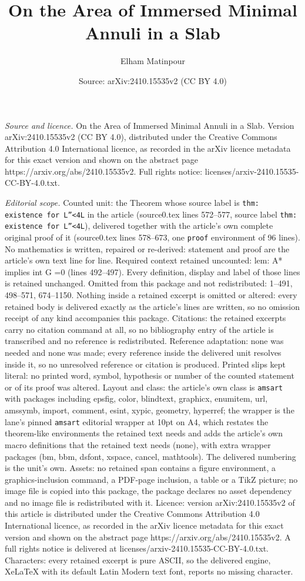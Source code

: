 \documentclass[10pt,a4paper]{amsart}
\title[On the Area of Immersed Minimal Annuli in a Slab]{On the Area of Immersed Minimal Annuli in a Slab}
\author{Elham Matinpour}
\date{Source: arXiv:2410.15535v2 (CC BY 4.0)}
\begin{document}
\maketitle

\noindent\emph{Source and licence.} On the Area of Immersed Minimal Annuli in a Slab. Version arXiv:2410.15535v2 (CC BY 4.0), distributed under the Creative Commons Attribution 4.0 International licence, as recorded in the arXiv licence metadata for this exact version and shown on the abstract page https://arxiv.org/abs/2410.15535v2. Full rights notice: licenses/arxiv-2410.15535-CC-BY-4.0.txt.\par\smallskip

\noindent\textit{Editorial scope.} Counted unit: the Theorem whose source label is \texttt{thm: existence for L''<4L} in the article (source0.tex lines 572--577, source label \texttt{thm: existence for L''<4L}), delivered together with the article's own complete original proof of it (source0.tex lines 578--673, one \texttt{proof} environment of 96 lines). No mathematics is written, repaired or re-derived: statement and proof are the article's own text line for line. Required context retained uncounted: lem: A* implies int G =0 (lines 492--497). Every definition, display and label of those lines is retained unchanged. Omitted from this package and not redistributed: 1--491, 498--571, 674--1150. Nothing inside a retained excerpt is omitted or altered: every retained body is delivered exactly as the article's lines are written, so no omission receipt of any kind accompanies this package. Citations: the retained excerpts carry no citation command at all, so no bibliography entry of the article is transcribed and no reference is redistributed. Reference adaptation: none was needed and none was made; every reference inside the delivered unit resolves inside it, so no unresolved reference or citation is produced. Printed slips kept literal: no printed word, symbol, hypothesis or number of the counted statement or of its proof was altered. Layout and class: the article's own class is \texttt{amsart} with packages including epsfig, color, blindtext, graphicx, enumitem, url, amssymb, import, comment, esint, xypic, geometry, hyperref; the wrapper is the lane's pinned \texttt{amsart} editorial wrapper at 10pt on A4, which restates the theorem-like environments the retained text needs and adds the article's own macro definitions that the retained text needs (none), with extra wrapper packages (bm, bbm, dsfont, xspace, cancel, mathtools). The delivered numbering is the unit's own. Assets: no retained span contains a figure environment, a graphics-inclusion command, a PDF-page inclusion, a table or a TikZ picture; no image file is copied into this package, the package declares no asset dependency and no image file is redistributed with it. Licence: version arXiv:2410.15535v2 of this article is distributed under the Creative Commons Attribution 4.0 International licence, as recorded in the arXiv licence metadata for this exact version and shown on the abstract page https://arxiv.org/abs/2410.15535v2. A full rights notice is delivered at licenses/arxiv-2410.15535-CC-BY-4.0.txt. Characters: every retained excerpt is pure ASCII, so the delivered engine, XeLaTeX with its default Latin Modern text font, reports no missing character.
\end{document}
